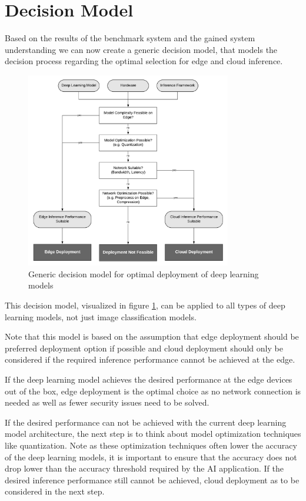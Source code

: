 \section{Decision Model}\label{chap:DecisionModel}

Based on the results of the benchmark system and the gained system understanding we can now create a generic decision model, that models the decision process regarding the optimal selection for edge and cloud inference.

\begin{figure}[!htb]
\centering
\includegraphics[width=0.8\textwidth]{./Bilder/DecisionModel.pdf}
\caption{Generic decision model for optimal deployment of deep learning models}
\label{fig:DecisionModel}
\end{figure}


This decision model, visualized in figure \ref{fig:DecisionModel}, can be applied to all types of deep learning models, not just image classification models.

Note that this model is based on the assumption that edge deployment should be preferred deployment option if possible and cloud deployment should only be considered if the required inference performance cannot be achieved at the edge.


If the deep learning model achieves the desired performance at the edge devices out of the box, edge deployment is the optimal choice as no network connection is needed as well as fewer security issues need to be solved.

If the desired performance can not be achieved with the current deep learning model architecture, the next step is to think about model optimization techniques like quantization.
Note as these optimization techniques often lower the accuracy of the deep learning models, it is important to ensure that the accuracy does not drop lower than the accuracy threshold required by the AI application.
If the desired inference performance still cannot be achieved, cloud deployment as to be considered in the next step.

